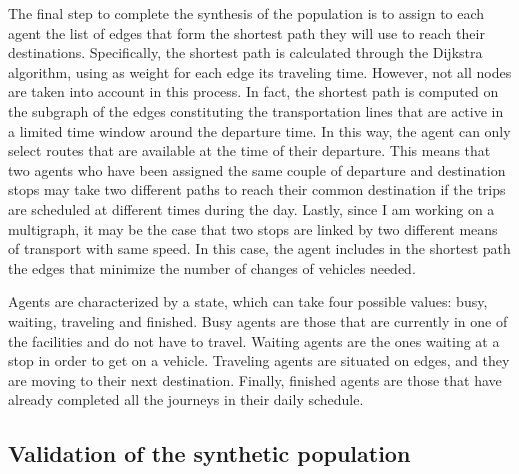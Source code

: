 The final step to complete the synthesis of the population is to assign to each agent the list of edges that form the shortest path they will use to reach their destinations. Specifically, the shortest path is calculated through the Dijkstra algorithm, using as weight for each edge its traveling time. However, not all nodes are taken into account in this process. In fact, the shortest path is computed on the subgraph of the edges constituting the transportation lines that are active in a limited time window around the departure time. In this way, the agent can only select routes that are available at the time of their departure. This means that two agents who have been assigned the same couple of departure and destination stops may take two different paths to reach their common destination if the trips are scheduled at different times during the day. Lastly, since I am working on a multigraph, it may be the case that two stops are linked by two different means of transport with same speed. In this case, the agent includes in the shortest path the edges that minimize the number of changes of vehicles needed. 


Agents are characterized by a state, which can take four possible values: busy, waiting, traveling and finished. Busy agents are those that are currently in one of the facilities and do not have to travel. Waiting agents are the ones waiting at a stop in order to get on a vehicle. Traveling agents are situated on edges, and they are moving to their next destination. Finally, finished agents are those that have already completed all the journeys in their daily schedule. 


\subsection*{Validation of the synthetic population}\label{ssec:3.3.1}

